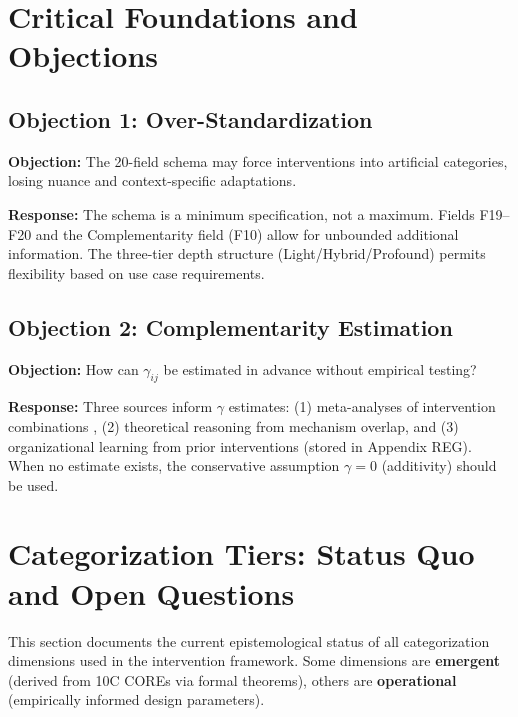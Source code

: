 \section{Critical Foundations and Objections}
\label{sec:hhh-foundations}

\subsection{Objection 1: Over-Standardization}

\textbf{Objection:} The 20-field schema may force interventions into artificial categories, losing nuance and context-specific adaptations.

\textbf{Response:} The schema is a minimum specification, not a maximum. Fields F19--F20 and the Complementarity field (F10) allow for unbounded additional information. The three-tier depth structure (Light/Hybrid/Profound) permits flexibility based on use case requirements.

\subsection{Objection 2: Complementarity Estimation}

\textbf{Objection:} How can $\gamma_{ij}$ be estimated in advance without empirical testing?

\textbf{Response:} Three sources inform $\gamma$ estimates: (1) meta-analyses of intervention combinations \citep{johnson2021}, (2) theoretical reasoning from mechanism overlap, and (3) organizational learning from prior interventions (stored in Appendix REG). When no estimate exists, the conservative assumption $\gamma = 0$ (additivity) should be used.


\section{Categorization Tiers: Status Quo and Open Questions}
\label{sec:hhh-categorization-tiers}

This section documents the current epistemological status of all categorization dimensions used in the intervention framework. Some dimensions are \textbf{emergent} (derived from 10C COREs via formal theorems), others are \textbf{operational} (empirically informed design parameters).


